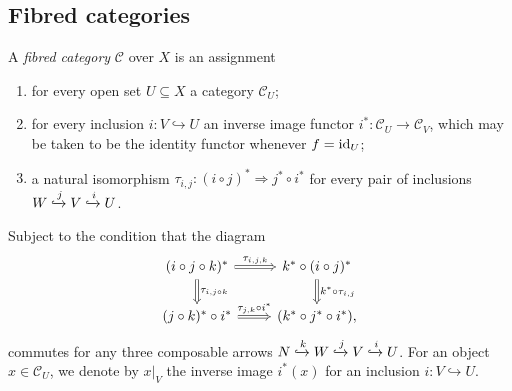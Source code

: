 \subsection{Fibred categories}
\begin{definition}\label{def:fibred-category}
	A \textit{fibred category} $\mathcal{C}$ over $X$ is an assignment 
	\begin{enumerate}[label = (\roman*)]
		\item for every open set $U \subseteq X$ a category $\mathcal{C}_U$;
		\item for every inclusion $i\colon V \hookrightarrow U$ an inverse image functor $i^{*}\colon \mathcal{C}_{U} \to \mathcal{C}_{V}$, which may be taken to be the identity functor whenever $f = \operatorname{id}_{U}$;
		\item a natural isomorphism $\tau_{i,j}\colon (i\circ j)^{*} \Rightarrow j^{*} \circ i^{*}$ for every pair of inclusions $W \xhookrightarrow{j} V \xhookrightarrow{i} U$.
	\end{enumerate}
	Subject to the condition that the diagram
	\begin{equation}\label{eqn:fibred-category-compatibility}
		\begin{tikzcd}
			(i\circ j \circ k)^{*} \ar[r, Rightarrow, "\tau_{i,j,k}"] \ar[d, Rightarrow, "\tau_{i, j\circ k}"] & k^{*}\circ(i \circ j)^{*} \ar[d, Rightarrow, "k^{*} \circ \tau_{i,j}"] \\
			(j\circ k)^{*} \circ i^{*} \ar[r, Rightarrow, "\tau_{j, k} \circ i^{*}"] & (k^{*} \circ j^{*} \circ i^{*}),
		\end{tikzcd}
	\end{equation}
	commutes for any three composable arrows $N \xhookrightarrow{k} W \xhookrightarrow{j} V \xhookrightarrow{i} U$. For an object $x \in \mathcal{C}_{U}$, we denote by $x\lvert_{V}$ the inverse image $i^{*}(x)$ for an inclusion $i\colon V \hookrightarrow U$.
\end{definition}
